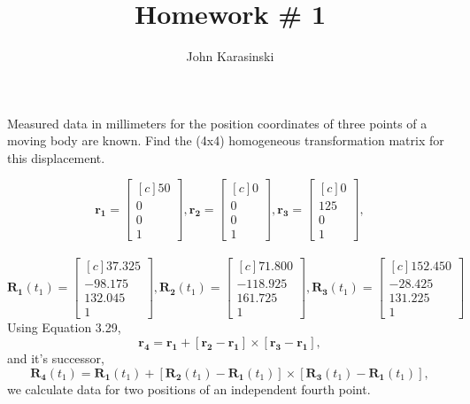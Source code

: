 \documentclass[onecolumn,10pt]{jhwhw}
\author{John Karasinski}
\title{Homework \# 1}
\begin{document}

\problem{}
Measured data in millimeters for the position coordinates of three points of a moving body are known. Find the (4x4) homogeneous transformation matrix for this displacement.

\[
\bm{r_1} =
\begin{bmatrix*}[c]
50 \\
0 \\
0 \\
1 
\end{bmatrix*}
,
\bm{r_2} =
\begin{bmatrix*}[c]
0 \\
0 \\
0 \\
1 
\end{bmatrix*}
,
\bm{r_3} =
\begin{bmatrix*}[c]
0 \\
125 \\
0 \\
1 
\end{bmatrix*}
,
\]\\
\[
\bm{R_1} (t_1) =
\begin{bmatrix*}[c]
37.325 \\
-98.175 \\
132.045 \\
1 
\end{bmatrix*}
,
\bm{R_2} (t_1) =
\begin{bmatrix*}[c]
71.800 \\
-118.925 \\
161.725 \\
1 
\end{bmatrix*}
,
\bm{R_3} (t_1) =
\begin{bmatrix*}[c]
152.450 \\
-28.425 \\
131.225 \\
1 
\end{bmatrix*}
\]
Using Equation 3.29,
\[
\bm{r_4} = \bm{r_1} + \left [ \bm{r_2} - \bm{r_1} \right ] \times \left [ \bm{r_3}-\bm{r_1} \right ],
\]
and it's successor,
\[
\bm{R_4}(t_1) = \bm{R_1}(t_1) + \left [ \bm{R_2}(t_1) - \bm{R_1}(t_1) \right ] \times \left [ \bm{R_3} (t_1) - \bm{R_1}(t_1) \right ],
\]
we calculate data for two positions of an independent fourth point.
\end{document}
